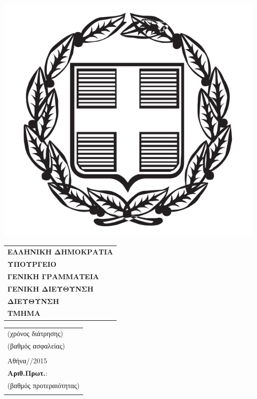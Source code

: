 \documentclass[12pt]{article}
\begin{document}
\begin{flushleft}
\includegraphics[scale=0.1]{ethnosimo.png}
\end{flushleft}
\vspace{1cm}
\noindent
\begin{minipage}{.6\textwidth}
	\begin{tabular}{l}
		  \\ 
		\textbf{ΕΛΛΗΝΙΚΗ ΔΗΜΟΚΡΑΤΙΑ} \\ 
		 \textbf{ΥΠΟΥΡΓΕΙΟ}  \\
		\textbf{ΓΕΝΙΚΗ ΓΡΑΜΜΑΤΕΙΑ}\\ 
		 \textbf{ΓΕΝΙΚΗ ΔΙΕΥΘΥΝΣΗ} \\ 
		\textbf{ΔΙΕΥΘΥΝΣΗ} \\ 
		 \textbf{ΤΜΗΜΑ} \\ 
		\end{tabular} 
\end{minipage}
\begin{minipage}{.4\textwidth}
	\begin{tabular}{l}
		 (χρόνος διάτρησης) \\ 
		  (βαθμός ασφαλείας)\\ 
		  \\ 
		  Αθήνα\quad /\qquad /2015\\ 
		  \textbf{Αριθ.Πρωτ.}:\\ 
		  (βαθμός προτεραιότητας)\\ 
		  \\ 
		\end{tabular} 
\end{minipage}
\end{document}

